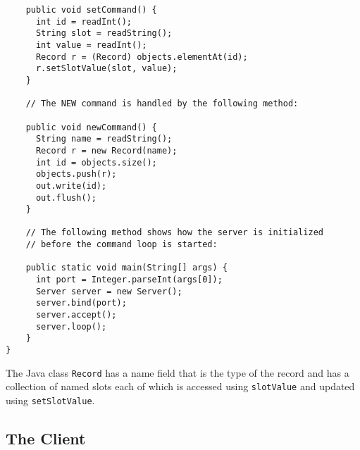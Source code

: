 \documentclass{article}
\begin{document}
\begin{verbatim}
    public void setCommand() {
      int id = readInt();
      String slot = readString();
      int value = readInt();
      Record r = (Record) objects.elementAt(id);
      r.setSlotValue(slot, value);
    }
    
    // The NEW command is handled by the following method:

    public void newCommand() {
      String name = readString();
      Record r = new Record(name);
      int id = objects.size();
      objects.push(r);
      out.write(id);
      out.flush();
    }
    
    // The following method shows how the server is initialized
    // before the command loop is started:

    public static void main(String[] args) {
      int port = Integer.parseInt(args[0]);
      Server server = new Server();
      server.bind(port);
      server.accept();
      server.loop();
    }
}
\end{verbatim}
The Java class {\tt Record} has a name field that is the type of the record and has a 
collection of named slots each of which is accessed using {\tt slotValue} and updated
using {\tt setSlotValue}.

\subsection{The Client}
\end{document}
